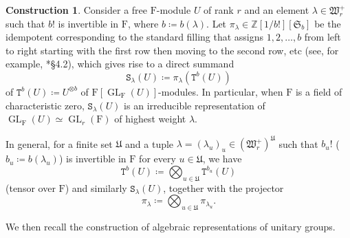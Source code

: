 \documentclass[12pt]{amsart}
\numberwithin{equation}{section}
\theoremstyle{plain}
\theoremstyle{definition}
\newtheorem{construction}[proposition]{Construction}
\theoremstyle{remark}
\renewcommand{\d}[1]{\mathbb{#1}}
\newcommand{\f}[1]{\mathfrak{#1}}
\renewcommand{\r}[1]{\mathrm{#1}}
\renewcommand{\(}{\left(}
\renewcommand{\)}{\right)}
\newcommand{\dZ}{\d Z}
\newcommand{\fS}{\f S}
\newcommand{\fU}{\f U}
\newcommand{\fW}{\f W}
\newcommand{\rF}{\r F}
\newcommand{\tS}{\mathtt{S}}
\newcommand{\tT}{\mathtt{T}}
\DeclareMathOperator{\GL}{GL}
\begin{document}
\begin{construction}\label{co:representation_general}
Consider a free $\rF$-module $U$ of rank $r$ and an element $\lambda\in\fW_r^+$ such that $b!$ is invertible in $\rF$, where $b\coloneqq b(\lambda)$. Let $\pi_\lambda\in\dZ[1/b!][\fS_b]$ be the idempotent corresponding to the standard filling that assigns $1,2,\dots,b$ from left to right starting with the first row then moving to the second row, etc (see, for example, \cite{FH91}*{\S4.2}), which gives rise to a direct summand
\[
\tS_\lambda(U)\coloneqq\pi_\lambda\(\tT^b(U)\)
\]
of $\tT^b(U)\coloneqq U^{\otimes b}$ of $\rF[\GL_\rF(U)]$-modules. In particular, when $\rF$ is a field of characteristic zero, $\tS_\lambda(U)$ is an irreducible representation of $\GL_\rF(U)\simeq\GL_r(\rF)$ of highest weight $\lambda$.

In general, for a finite set $\fU$ and a tuple $\lambda=(\lambda_u)_u\in(\fW_r^+)^\fU$ such that $b_u!$ ($b_u\coloneqq b(\lambda_u)$) is invertible in $\rF$ for every $u\in\fU$, we have
\[
\tT^b(U)\coloneqq\bigotimes_{u\in\fU}\tT^{b_u}(U)
\]
(tensor over $\rF$) and similarly $\tS_\lambda(U)$, together with the projector
\[
\pi_\lambda\coloneqq\bigotimes_{u\in\fU}\pi_{\lambda_u}.
\]
\end{construction}



We then recall the construction of algebraic representations of unitary groups.
\end{document}

